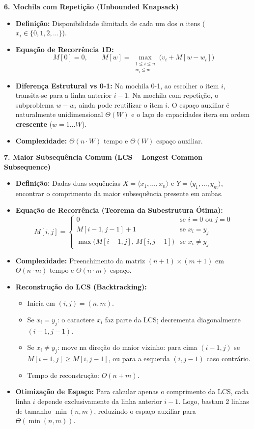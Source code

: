 \documentclass[11pt,a4paper]{article}
\newcommand{\topico}[1]{\par\medskip\textbf{\color{azul}#1}\par}
\begin{document}
\topico{6. Mochila com Repetição (Unbounded Knapsack)}
\begin{itemize}
  \item \textbf{Definição:} Disponibilidade ilimitada de cada um dos $n$ itens ($x_i \in \{0, 1, 2, \dots\}$).
  \item \textbf{Equação de Recorrência 1D:}
  \[
  \boxed{M[0] = 0, \qquad M[w] = \max_{\substack{1 \le i \le n \\ w_i \le w}} \big(v_i + M[w - w_i]\big)}
  \]
  \item \textbf{Diferença Estrutural vs 0-1:} Na mochila 0-1, ao escolher o item $i$, transita-se para a linha anterior $i-1$. Na mochila com repetição, o subproblema $w - w_i$ ainda pode reutilizar o item $i$. O espaço auxiliar é naturalmente unidimensional $\Theta(W)$ e o laço de capacidades itera em ordem \textbf{crescente} ($w = 1 \dots W$).
  \item \textbf{Complexidade:} $\Theta(n \cdot W)$ tempo e $\Theta(W)$ espaço auxiliar.
\end{itemize}

\topico{7. Maior Subsequência Comum (LCS -- Longest Common Subsequence)}
\begin{itemize}
  \item \textbf{Definição:} Dadas duas sequências $X = \langle x_1, \dots, x_n \rangle$ e $Y = \langle y_1, \dots, y_m \rangle$, encontrar o comprimento da maior subsequência presente em ambas.
  \item \textbf{Equação de Recorrência (Teorema da Subestrutura Ótima):}
  \[
  \boxed{M[i, j] = \begin{cases}
  0 & \text{se } i = 0 \text{ ou } j = 0 \\
  M[i-1, j-1] + 1 & \text{se } x_i = y_j \\
  \max\big(M[i-1, j], \, M[i, j-1]\big) & \text{se } x_i \neq y_j
  \end{cases}}
  \]
  \item \textbf{Complexidade:} Preenchimento da matriz $(n+1) \times (m+1)$ em $\Theta(n \cdot m)$ tempo e $\Theta(n \cdot m)$ espaço.
  \item \textbf{Reconstrução do LCS (Backtracking):}
  \begin{itemize}
    \item Inicia em $(i, j) = (n, m)$.
    \item Se $x_i = y_j$: o caractere $x_i$ faz parte da LCS; decrementa diagonalmente $(i-1, j-1)$.
    \item Se $x_i \neq y_j$: move na direção do maior vizinho: para cima $(i-1, j)$ se $M[i-1, j] \ge M[i, j-1]$, ou para a esquerda $(i, j-1)$ caso contrário.
    \item Tempo de reconstrução: $O(n + m)$.
  \end{itemize}
  \item \textbf{Otimização de Espaço:} Para calcular apenas o comprimento da LCS, cada linha $i$ depende exclusivamente da linha anterior $i-1$. Logo, bastam 2 linhas de tamanho $\min(n, m)$, reduzindo o espaço auxiliar para $\Theta(\min(n, m))$.
\end{itemize}
\end{document}
